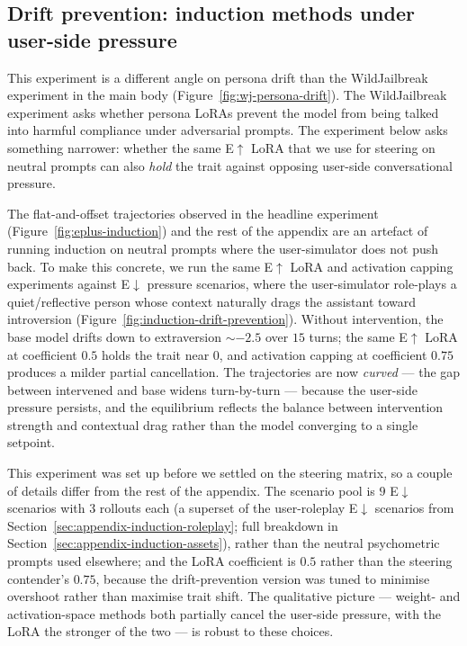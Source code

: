 \subsection{Drift prevention: induction methods under user-side pressure}\label{sec:appendix-induction-drift-prevention}

This experiment is a different angle on persona drift than the WildJailbreak experiment in the main body (Figure~\ref{fig:wj-persona-drift}). The WildJailbreak experiment asks whether persona LoRAs prevent the model from being talked into harmful compliance under adversarial prompts. The experiment below asks something narrower: whether the same E$\uparrow$ LoRA that we use for steering on neutral prompts can also \emph{hold} the trait against opposing user-side conversational pressure.

The flat-and-offset trajectories observed in the headline experiment (Figure~\ref{fig:eplus-induction}) and the rest of the appendix are an artefact of running induction on neutral prompts where the user-simulator does not push back. To make this concrete, we run the same E$\uparrow$ LoRA and activation capping experiments against E$\downarrow$ pressure scenarios, where the user-simulator role-plays a quiet/reflective person whose context naturally drags the assistant toward introversion (Figure~\ref{fig:induction-drift-prevention}). Without intervention, the base model drifts down to extraversion ${\sim}-2.5$ over $15$ turns; the same E$\uparrow$ LoRA at coefficient $0.5$ holds the trait near $0$, and activation capping at coefficient $0.75$ produces a milder partial cancellation. The trajectories are now \emph{curved} --- the gap between intervened and base widens turn-by-turn --- because the user-side pressure persists, and the equilibrium reflects the balance between intervention strength and contextual drag rather than the model converging to a single setpoint.

This experiment was set up before we settled on the steering matrix, so a couple of details differ from the rest of the appendix. The scenario pool is $9$ E$\downarrow$ scenarios with $3$ rollouts each (a superset of the user-roleplay E$\downarrow$ scenarios from Section~\ref{sec:appendix-induction-roleplay}; full breakdown in Section~\ref{sec:appendix-induction-assets}), rather than the neutral psychometric prompts used elsewhere; and the LoRA coefficient is $0.5$ rather than the steering contender's $0.75$, because the drift-prevention version was tuned to minimise overshoot rather than maximise trait shift. The qualitative picture --- weight- and activation-space methods both partially cancel the user-side pressure, with the LoRA the stronger of the two --- is robust to these choices.


